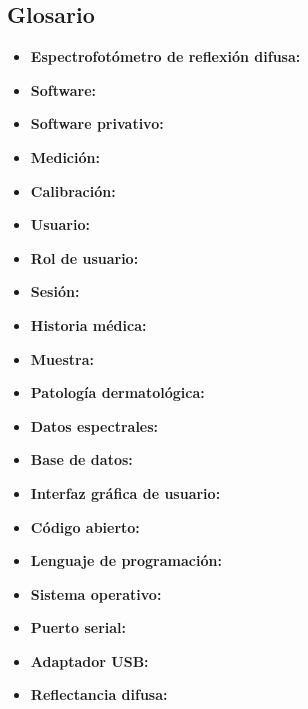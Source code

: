 \subsection{Glosario}

\begin{itemize}
	\item \textbf{Espectrofot\'{o}metro de reflexi\'{o}n difusa: }
	
	\item \textbf{Software: }	
	
	\item \textbf{Software privativo: }
	
	\item \textbf{Medici\'{o}n: }
	
	\item \textbf{Calibraci\'{o}n: }
	
	\item \textbf{Usuario: }
	
	\item \textbf{Rol de usuario: }
	
	\item \textbf{Sesi\'{o}n: }
	
	\item \textbf{Historia m\'{e}dica: }
	
	\item \textbf{Muestra: }
	
	\item \textbf{Patolog\'{i}a dermatol\'{o}gica: }
	
	\item \textbf{Datos espectrales: }
	
	\item \textbf{Base de datos: }
	
	\item \textbf{Interfaz gr\'{a}fica de usuario: }
	
	\item \textbf{C\'{o}digo abierto: }
	
	\item \textbf{Lenguaje de programaci\'{o}n: }
	
	\item \textbf{Sistema operativo: }
	
	\item \textbf{Puerto serial: }
	
	\item \textbf{Adaptador USB: }
	
	\item \textbf{Reflectancia difusa: }
	

\end{itemize}
